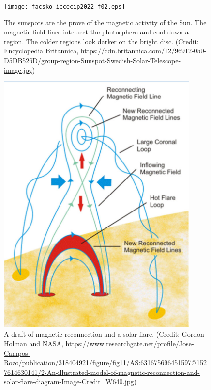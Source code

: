 \documentclass[sn-aps]{sn-jnl}%
\begin{document}
\begin{figure}[h]
\centering
\texttt{[image: facsko\_iccecip2022-f02.eps]}
\caption{The sunspots are the prove of the magnetic activity of the Sun. The magnetic field lines intersect the photosphere and cool down a region. The colder regions look darker on the bright disc. (Credit: Encyclopedia Britannica, \url{https://cdn.britannica.com/12/96912-050-D5DB526D/group-region-Sunspot-Swedish-Solar-Telescope-image.jpg})}\label{fig:sunspot}
\end{figure}


\begin{figure}[h]
\centering
\includegraphics[width=0.9\textwidth]{facsko_iccecip2022-f03.eps}
\caption{A draft of magnetic reconnection and a solar flare. (Credit: Gordon Holman and NASA, \url{https://www.researchgate.net/profile/Jose-Campos-Rozo/publication/318404921/figure/fig11/AS:631675696451597@1527614630141/2-An-illustrated-model-of-magnetic-reconnection-and-solar-flare-diagram-Image-Credit_W640.jpg})}\label{fig:reconnection}
\end{figure}
\end{document}
